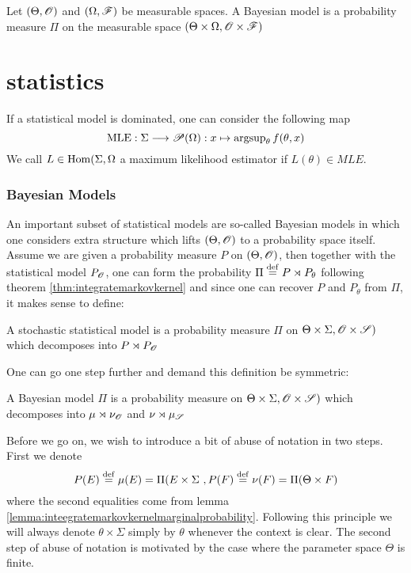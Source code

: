 \begin{definition}
Let $(\Theta,\r{O})$ and $(\Omega,\r{F})$ be measurable spaces.
A Bayesian model is a probability measure $\Pi$ on the measurable space $(\Theta\times \Omega, \r{O}\times\r{F})$
\end{definition}

\part{statistics}



If a statistical model is dominated, one can consider the following map
\[
\MLE: \Sigma\mor \r{P}(\Omega):x \fun \argsup_\theta f(\theta,x)
\]
We call $L \in \operatorname{Hom}(\Sigma,\Omega$ a maximum likelihood estimator if $L(\theta)\in MLE$.
\section{Bayesian Models}



An important subset of statistical models are so-called Bayesian models in which one considers extra structure which lifts $(\Theta,\r{O})$ to a probability space itself. Assume we are given a probability measure $P$ on $(\Theta,\r{O})$, then together with the statistical model $P_\r{O}$, one can form the probability $\Pi\stackrel{\operatorname{def}}{=} P\rtimes P_\theta$ following theorem \ref{thm:integratemarkovkernel}  and since one can recover $P$ and $P_\theta$ from $\Pi$, it makes sense to define:
\begin{definition}\label{def:stochasticmodel}
A stochastic statistical model is a probability measure $\Pi$ on $\Theta\times \Sigma, \r{O}\times \r{S})$ which decomposes into $P\rtimes P_\r{O}$
\end{definition}

One can go one step further and demand this definition be symmetric:

\begin{definition}\label{def:bayesianmodel}
A Bayesian model  $\Pi$ is a probability measure on $\Theta\times \Sigma, \r{O}\times \r{S})$ which decomposes into $\mu \rtimes \nu_\r{O}$ and $\nu\rtimes \mu_\r{S}$	
\end{definition}

Before we go on, we wish to introduce a bit of abuse of notation in two steps. First we denote
\[
P(E)\stackrel{\operatorname{def}}{=} \mu(E)=\Pi(E\times \Sigma \,\,, P(F)\stackrel{\operatorname{def}}{=} \nu(F)=\Pi(\Theta\times F)
\]
where the second equalities come from lemma \ref{lemma:inteegratemarkovkernelmarginalprobability}. Following this principle we will always denote $\theta \times \Sigma$ simply by $\theta$ whenever the context is clear.
The second step of abuse of notation is motivated by the case where the parameter space $\Theta$ is finite.\\

